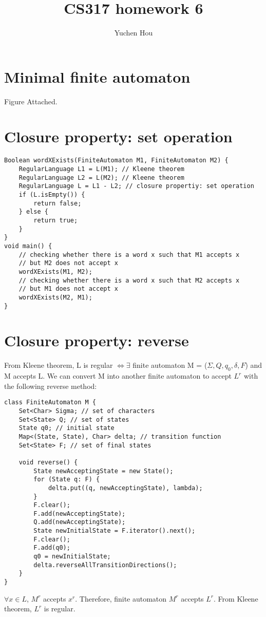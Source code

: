 \documentclass{article}
\begin{document}
\lstset{language=Java}
\title{CS317 homework 6}
\author{Yuchen Hou}
\maketitle
\section{Minimal finite automaton}
Figure Attached.
\section{Closure property: set operation}
\begin{lstlisting}
Boolean wordXExists(FiniteAutomaton M1, FiniteAutomaton M2) {
	RegularLanguage L1 = L(M1); // Kleene theorem
	RegularLanguage L2 = L(M2); // Kleene theorem
	RegularLanguage L = L1 - L2; // closure propertiy: set operation
	if (L.isEmpty()) {
		return false;
	} else {
		return true;
	}
}
void main() {
	// checking whether there is a word x such that M1 accepts x
	// but M2 does not accept x
	wordXExists(M1, M2);
	// checking whether there is a word x such that M2 accepts x
	// but M1 does not accept x
	wordXExists(M2, M1);
}
\end{lstlisting}
\section{Closure property: reverse}
From Kleene theorem, L is regular $\iff \exists$ finite automaton M =
($\Sigma, Q, q_0, \delta, F$) and M accepts L. We can convert M into another
finite automaton to accept $L^r$ with the following reverse method:
\begin{lstlisting}
class FiniteAutomaton M {
	Set<Char> Sigma; // set of characters
	Set<State> Q; // set of states
	State q0; // initial state
	Map<(State, State), Char> delta; // transition function
	Set<State> F; // set of final states

	void reverse() {
		State newAcceptingState = new State();
		for (State q: F) {
			delta.put((q, newAcceptingState), lambda);
		}
		F.clear();
		F.add(newAcceptingState);
		Q.add(newAcceptingState);
		State newInitialState = F.iterator().next();
		F.clear();
		F.add(q0);
		q0 = newInitialState;
		delta.reverseAllTransitionDirections();
	}
}
\end{lstlisting}
$\forall x \in L$, $M^r$ accepts $x^r$. Therefore, finite automaton $M^r$
accepts $L^r$. From Kleene theorem, $L^r$ is regular.
\end{document}

